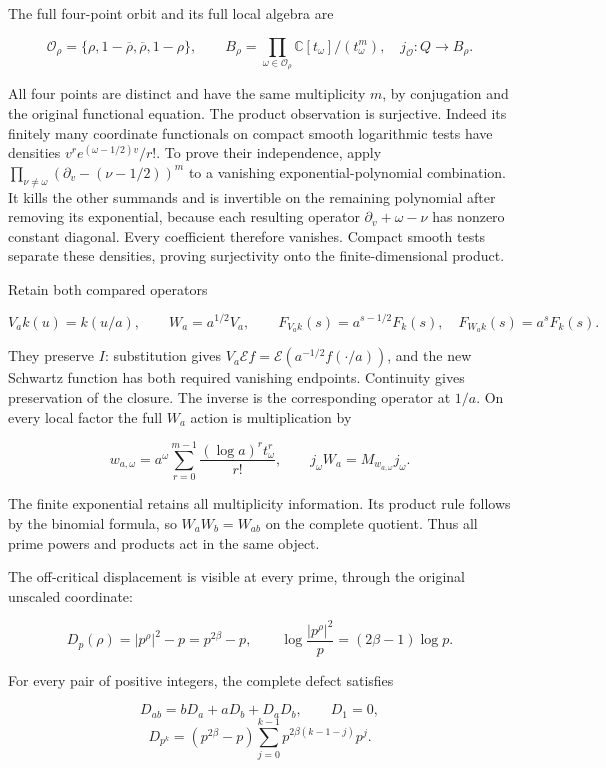 The full four-point orbit and its full local algebra are

\[
\mathcal O_\rho=\{\rho,1-\overline\rho,\overline\rho,1-\rho\},
\qquad
B_\rho=\prod_{\omega\in\mathcal O_\rho}\mathbb C[t_\omega]/(t_\omega^m),
\quad j_{\mathcal O}:Q\longrightarrow B_\rho.
\tag{IH3.1}
\]

All four points are distinct and have the same multiplicity \(m\), by
conjugation and the original functional equation. The product
observation is surjective. Indeed its finitely many coordinate
functionals on compact smooth logarithmic tests have densities
\(v^r e^{(\omega-1/2)v}/r!\). To prove their independence, apply
\(\prod_{\nu\ne\omega}(\partial_v-(\nu-1/2))^m\) to a vanishing
exponential-polynomial combination. It kills the other summands and is
invertible on the remaining polynomial after removing its exponential,
because each resulting operator \(\partial_v+\omega-\nu\) has nonzero
constant diagonal. Every coefficient therefore vanishes. Compact smooth
tests separate these densities, proving surjectivity onto the
finite-dimensional product.

Retain both compared operators

\[
V_a k(u)=k(u/a),\qquad W_a=a^{1/2}V_a,\qquad
F_{V_a k}(s)=a^{s-1/2}F_k(s),\quad F_{W_a k}(s)=a^sF_k(s).
\tag{IH3.2}
\]

They preserve \(I\): substitution gives
\(V_a\mathcal E f=\mathcal E(a^{-1/2}f(\cdot/a))\), and the new Schwartz
function has both required vanishing endpoints. Continuity gives
preservation of the closure. The inverse is the corresponding operator
at \(1/a\). On every local factor the full \(W_a\) action is
multiplication by

\[
w_{a,\omega}=a^\omega\sum_{r=0}^{m-1}\frac{(\log a)^r t_\omega^r}{r!},
\qquad j_\omega W_a=M_{w_{a,\omega}}j_\omega.
\tag{IH3.3}
\]

The finite exponential retains all multiplicity information. Its product
rule follows by the binomial formula, so \(W_aW_b=W_{ab}\) on the
complete quotient. Thus all prime powers and products act in the same
object.

The off-critical displacement is visible at every prime, through the
original unscaled coordinate:

\[
D_p(\rho)=|p^\rho|^2-p=p^{2\beta}-p,
\qquad \log\frac{|p^\rho|^2}{p}=(2\beta-1)\log p.
\tag{IH3.4}
\]

For every pair of positive integers, the complete defect satisfies

\[
D_{ab}=bD_a+aD_b+D_aD_b,\qquad D_1=0,
\] \[
D_{p^k}=(p^{2\beta}-p)\sum_{j=0}^{k-1}p^{2\beta(k-1-j)}p^j.
\tag{IH3.5}
\]

